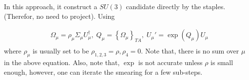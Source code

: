 In this approach, it construct a $SU(3)$ candidate directly by the staples. (Therefor, no need to project). Using

\begin{equation}
\begin{split}
&\Omega _{\mu}=\rho _{\mu} \Sigma _{\mu} U_{\mu}^{\dagger},\;Q_{\mu}=\left\{\Omega_{\mu}\right\}_{TA},\;U_{\mu}'=\exp (Q_{\mu}) U_{\mu}\\
\end{split}
\end{equation}
where $\rho_{\mu}$ is usually set to be $\rho_{1,2,3}=\rho,\rho_{4}=0$. Note that, there is no sum over $\mu$ in the above equation. Also, note that, $\exp$ is not accurate unless $\rho$ is small enough, however, one can iterate the smearing for a few sub-steps.

